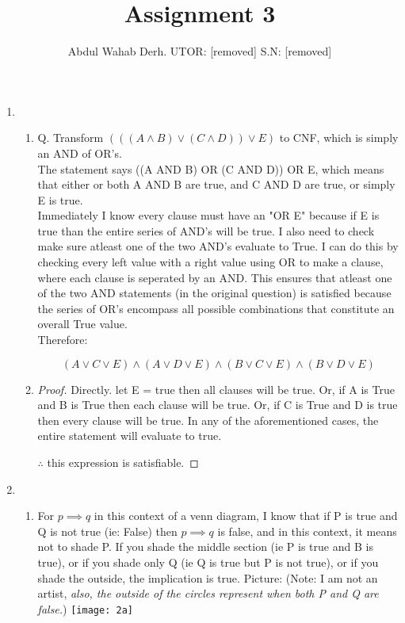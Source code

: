 \documentclass[11pt]{article}
\title{Assignment 3}
\author{Abdul Wahab Derh. UTOR: [removed] S.N: [removed]}
\begin{document}
\maketitle
\begin{enumerate}

\item { %
\begin{enumerate}
\item{ %
Q. Transform $(((A \wedge B) \lor (C \wedge D)) \lor E)$ to CNF, which is simply an AND of OR's.\\

The statement says ((A AND B) OR (C AND D)) OR E, which means that either or both A AND B are true, and C AND D are true, or simply E is true. \\

Immediately I know every clause must have an "OR E" because if E is true than the entire series of AND's will be true. I also need to check make sure atleast one of the two AND's evaluate to True. I can do this by checking every left value with a right value using OR to make a clause, where each clause is seperated by an AND. This ensures that atleast one of the two AND statements (in the original question) is satisfied because the series of OR's encompass all possible combinations that constitute an overall True value.\\

Therefore:

\[(A \lor C \lor E) \wedge (A \lor D \lor E) \wedge (B \lor C \lor E) \wedge (B \lor D \lor E)\]
}
\item{ %
\begin{proof}
Directly. let E = true then all clauses will be true. Or, if A is True and B is True then each clause will be true. Or, if C is True and D is true then every clause will be true. In any of the aforementioned cases, the entire statement will evaluate to true.

$\therefore$ this expression is satisfiable.
\end{proof}
}
\end{enumerate}
}
\item { %
\begin{enumerate}
\item{ %
For $p \implies q$ in this context of a venn diagram, I know that if P is true and Q is not true (ie: False) then $p \implies q$ is false, and in this context, it means not to shade P. If you shade the middle section (ie P is true and B is true), or if you shade only Q (ie Q is true but P is not true), or if you shade the outside, the implication is true. Picture: (Note: I am not an artist, \emph{also, the outside of the circles represent when both P and Q are false.})\linebreak
\texttt{[image: 2a]}
}


\end{enumerate}}
\end{enumerate}
\end{document}
